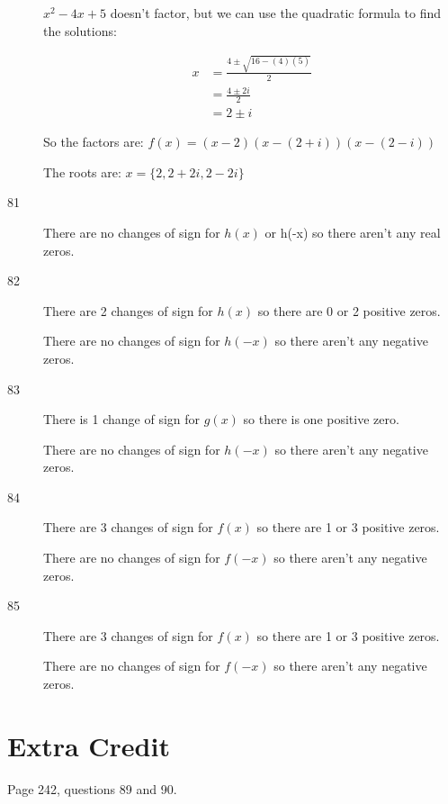 \documentclass[fleqn,addpoints]{exam}
\begin{document}
\begin{description}
$x^2-4x+5$ doesn't factor, but we can use the quadratic formula to find the solutions:

\begin{align*}
  x &= \frac{4 \pm \sqrt{16 - (4)(5)}}{2} \\
    &= \frac{4 \pm 2i}{2} \\
    &= 2 \pm i
\end{align*}

So the factors are: $f(x) = (x-2)(x - (2 + i))(x - (2-i))$

The roots are: $x = \{2, 2+2i, 2-2i \}$

\item[81]
There are no changes of sign for $h(x)$ or h(-x) so there aren't any real zeros.

\item[82]
There are 2 changes of sign for $h(x)$ so there are 0 or 2 positive zeros.

There are no changes of sign for $h(-x)$ so there aren't any negative zeros.

\item[83]
There is 1 change of sign for $g(x)$ so there is one positive zero.

There are no changes of sign for $h(-x)$ so there aren't any negative zeros.

\item[84]
There are 3 changes of sign for $f(x)$ so there are 1 or 3 positive zeros.

There are no changes of sign for $f(-x)$ so there aren't any negative zeros.

\item[85]
There are 3 changes of sign for $f(x)$ so there are 1 or 3 positive zeros.

There are no changes of sign for $f(-x)$ so there aren't any negative zeros.

\end{description}

\pagebreak

\fi

\section{Extra Credit}


Page 242, questions 89 and 90.
\end{document}
